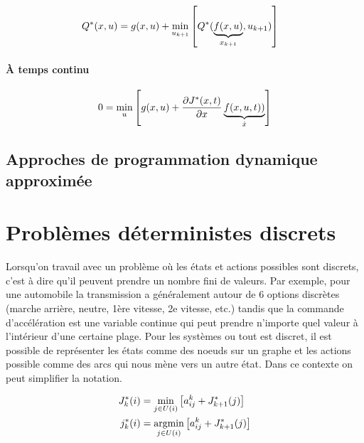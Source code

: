 \begin{align}
Q^*(x, u ) = g(x , u ) + 
\operatornamewithlimits{min}\limits_{u_{k+1}}
&\left[
Q^*( 
\underbrace{
f(x , u ) 
}_{x_{k+1}}
, u_{k+1}
)
\right] 
\end{align} 

\paragraph{À temps continu}

\begin{align}
0 =
\operatornamewithlimits{min}\limits_{u}
\left[
g(x , u ) + \frac{\partial	J^*(x,t)}{\partial x }
\underbrace{
f(x , u , t) )
}_{\dot{x}}
\right]
\label{eq:hjb}
\end{align} 


\newpage
\subsection{Approches de programmation dynamique approximée}


\newpage
\section{Problèmes déterministes discrets}
Lorsqu'on travail avec un problème où les états et actions possibles sont discrets, c'est à dire qu'il peuvent prendre un nombre fini de valeurs. Par exemple, pour une automobile la transmission a généralement autour de 6 options discrètes (marche arrière, neutre, 1ère vitesse, 2e vitesse, etc.) tandis que la commande d'accélération est une variable continue qui peut prendre n'importe quel valeur à l'intérieur d'une certaine plage. Pour les systèmes ou tout est discret, il est possible de représenter les états comme des noeuds sur un graphe et les actions possible comme des arcs qui nous mène vers un autre état. Dans ce contexte on peut simplifier la notation.


\begin{align}
J^*_k(i) &= 
\operatornamewithlimits{min}\limits_{j \in U(i)}
\left[
a_{ij}^k + J^*_{k+1}(j)
\right] \\
j^*_k(i) &= 
\operatornamewithlimits{argmin}\limits_{j \in U(i)}
\left[
a_{ij}^k + J^*_{k+1}(j)
\right] 
\label{eq:exactdpgraph}
\end{align} 

